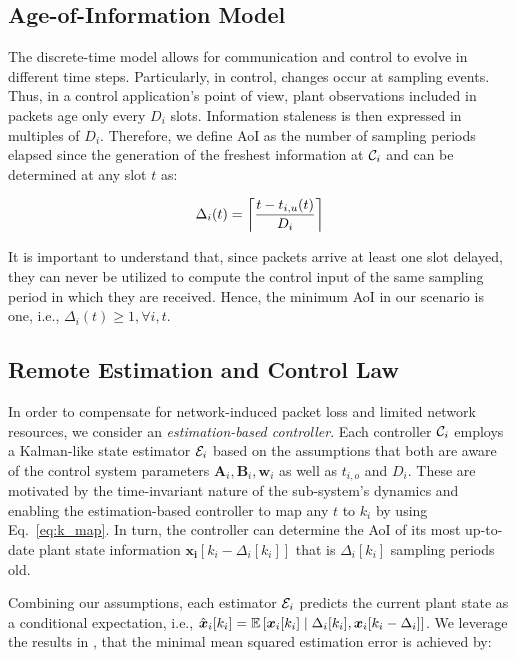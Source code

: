 \subsection*{Age-of-Information Model}
The discrete-time model allows for communication and control to evolve in
different time steps. Particularly, in control, changes occur at sampling
events. Thus, in a control application's point of view, plant observations
included in packets age only every $D_i$ slots. Information staleness is then
expressed in multiples of $D_i$. Therefore, we define AoI as the number of
sampling periods elapsed since the generation of the freshest information at
$\mathcal{C}_i$ and can be determined at any slot $t$ as:

\begin{equation}
  \label{eq:aoi}
  \Delta_i(t) = \left\lceil \dfrac{t - t_{i,u}(t)}{D_{i}} \right\rceil 
\end{equation}

It is important to understand that, since packets arrive at least one slot
delayed, they can never be utilized to compute the control input of the same
sampling period in which they are received. Hence, the minimum AoI in our
scenario is one, i.e., $\Delta_i(t) \ge 1,\forall i,t$.

\subsection*{Remote Estimation and Control Law}
In order to compensate for network-induced packet loss and limited network
resources, we consider an \textit{estimation-based controller}. Each controller
$\mathcal{C}_i$ employs a Kalman-like state estimator $\mathcal{E}_i$ based on the
assumptions that both are aware of the control system parameters
$\boldsymbol{A}_i, \boldsymbol{B}_i, \boldsymbol{w}_i$ as well as $t_{i,o}$ and
$D_i$. These are motivated by the time-invariant nature of the sub-system's
dynamics and enabling the estimation-based controller to map any $t$ to $k_i$ by
using Eq.~\eqref{eq:k_map}. In turn, the controller can determine the AoI of its
most up-to-date plant state information $\boldsymbol{x_i}[k_i-\Delta_i[k_i]]$
that is $\Delta_i[k_i]$ sampling periods old.

Combining our assumptions, each estimator $\mathcal{E}_i$ predicts the current
plant state as a conditional expectation, i.e., $\hat{\boldsymbol{x}}_i[k_i] =
\mathbb{E}\left[\boldsymbol{x}_i[k_i] \mid \Delta_i[k_i],\boldsymbol{x}_i[k_i-\Delta_i]
\right]$. We leverage the results in \cite{ayan2019age}, that the minimal mean
squared estimation error is achieved by:

